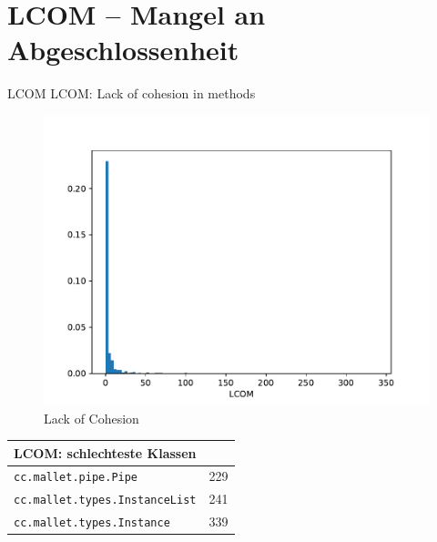 \documentclass{scrreprt}
\newcommand{\lstx}[1]{\lstinline$#1$}
\begin{document}
\section{LCOM – Mangel an Abgeschlossenheit}

LCOM
LCOM: Lack of cohesion in methods

\begin{figure}
 \centering
 \includegraphics[width=.8\textwidth]{./LCOM.pdf}
 \caption{Lack of Cohesion}
 \label{abb:lcom}
\end{figure}


\begin{center}
\end{center}


\begin{center}
\begin{tabular}{ll}
\toprule
LCOM: schlechteste Klassen \\
\midrule
\lstx{cc.mallet.pipe.Pipe} & 229\\
\lstx{cc.mallet.types.InstanceList} & 241\\
\lstx{cc.mallet.types.Instance} & 339 \\
\bottomrule
\end{tabular}
\end{center}
\end{document}

